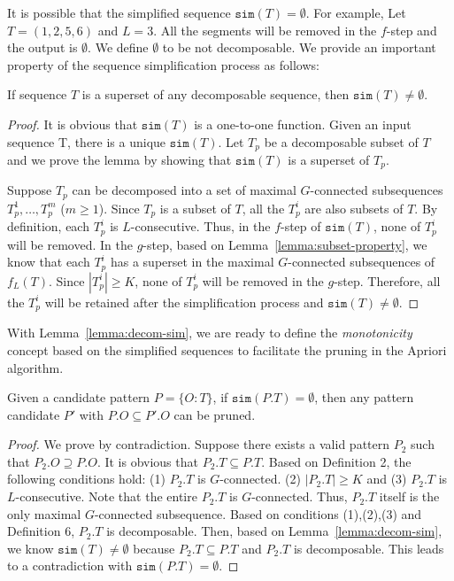 It is possible that the simplified sequence $\mathtt{sim}(T)=\emptyset$. For example, Let $T=(1,2,5,6)$ 
and $L=3$. All the segments will be removed in the $f$-step and the output is $\emptyset$.
We define $\emptyset$ to be not decomposable. 
We provide an important property of the sequence simplification process as follows:
\begin{lemma}\label{lemma:decom-sim}
If sequence $T$ is a superset of any decomposable sequence, then $\mathtt{sim}(T) \neq \emptyset$.
\end{lemma}
\begin{proof}
It is obvious that $\mathtt{sim}(T)$ is a one-to-one function. Given an input sequence T, there is a unique  $\mathtt{sim}(T)$. Let $T_p$ be a decomposable subset of $T$ and we prove the lemma by showing that $\mathtt{sim}(T)$ is a superset of $T_p$.

Suppose $T_p$ can be decomposed into a set of maximal $G$-connected
subsequences $T_p^1, \ldots, T_p^m$ ($m \geq 1$). Since $T_p$ is a subset of $T$, all the $T_p^i$ are also subsets of $T$. By definition, each $T_p^i$ is $L$-consecutive. Thus, in the $f$-step of $\mathtt{sim}(T)$, none of $T_p^i$ will be removed. In the $g$-step, based on Lemma~\ref{lemma:subset-property}, we know that each $T_p^i$ has a superset in the maximal $G$-connected subsequences of $f_L(T)$. Since $|T_p^i|\geq K$, none of $T_p^i$ will be removed in the $g$-step. Therefore, all the $T_p^i$ will be retained after the simplification process and $\mathtt{sim}(T) \neq \emptyset$.
\end{proof}

With Lemma~\ref{lemma:decom-sim}, we are ready to define the \emph{monotonicity} concept based on the simplified
sequences to facilitate the pruning in the Apriori algorithm. 

\begin{theorem}[Monotonicity]\label{THM:SPARE_MONO}
Given a candidate pattern $P=\{O:T\}$, if $\mathtt{sim}(P.T)=\emptyset$, then any pattern candidate $P'$ with $P.O \subseteq P'.O$ can be pruned.
\end{theorem}

\begin{proof}
We prove by contradiction. Suppose there exists a valid pattern $P_2$ such that $P_2.O \supseteq P.O$. It is obvious that $P_2.T \subseteq P.T$. Based on Definition 2, the following conditions hold: (1) $P_2.T$ is $G$-connected. (2) $|P_2.T| \geq K$ and (3) $P_2.T$ is $L$-consecutive. Note that the entire $P_2.T$ is $G$-connected. Thus, $P_2.T$ itself is the only maximal $G$-connected subsequence. Based on conditions (1),(2),(3) and Definition 6, $P_2.T$ is decomposable. Then, based on Lemma~\ref{lemma:decom-sim}, we know $\mathtt{sim}(T)\neq \emptyset$ because $P_2.T \subseteq P.T$ and $P_2.T$ is decomposable. This leads to a contradiction with $\mathtt{sim}(P.T)=\emptyset$.
\end{proof}

